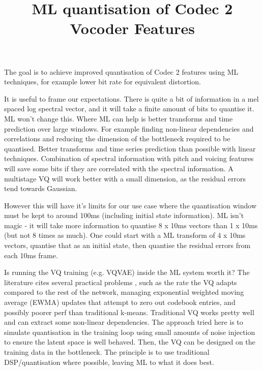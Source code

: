 \documentclass{article}
\begin{document}
\title{ML quantisation of Codec 2 Vocoder Features}
\maketitle

The goal is to achieve improved quantisation of Codec 2 features using ML techniques, for example lower bit rate for equivalent distortion.

It is useful to frame our expectations.  There is quite a bit of information in a mel spaced log spectral vector, and it will take a finite amount of bits to quantise it.  ML won't change this.  Where ML can help is better transforms and time prediction over large windows.  For example finding non-linear dependencies and correlations and reducing the dimension of the bottleneck required to be quantised.  Better transforms and time series prediction than possible with linear techniques. Combination of spectral information with pitch and voicing features will save some bits if they are correlated with the spectral information.  A multistage VQ will work better with a small dimension, as the residual errors tend towards Gaussian.

However this will have it's limits for our use case where the quantisation window must be kept to around 100ms (including initial state information). ML isn't magic - it will take more information to quantise 8 x 10ms vectors than 1 x 10ms (but not 8 times as much).  One could start with a ML transform of 4 x 10ms vectors, quantise that as an initial state, then quantise the residual errors from each 10ms frame.

Is running the VQ training (e.g. VQVAE) inside the ML system worth it?  The literature cites several practical problems \cite{mentzer2023finite}, such as the rate the VQ adapts compared to the rest of the network, managing exponential weighted moving average (EWMA) updates that attempt to zero out codebook entries, and possibly poorer perf than traditional k-means.  Traditional VQ works pretty well and can extract some non-linear dependencies.  The approach tried here is to simulate quantisation in the training loop using small amounts of noise injection to ensure the latent space is well behaved. Then, the VQ can be designed on the training data in the bottleneck. The principle is to use traditional DSP/quantisation where possible, leaving ML to what it does best.  
\end{document}
